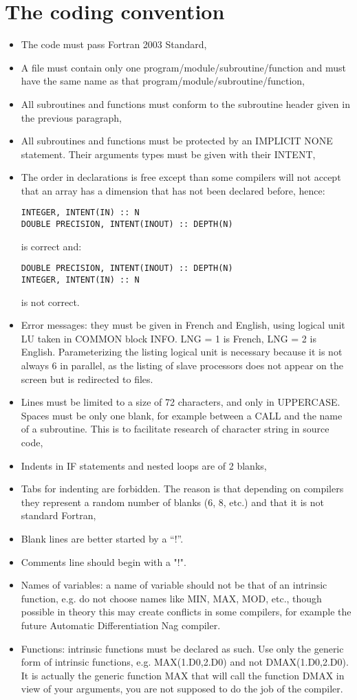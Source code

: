 \section{The coding convention}

\begin{itemize}
\item The code must pass Fortran 2003 Standard,
\item A file must contain only one program/module/subroutine/function and must
have the same name as that program/module/subroutine/function,
\item All subroutines and functions must conform to the subroutine header given
in the previous paragraph,
\item All subroutines and functions must be protected by an IMPLICIT NONE
statement. Their arguments types must be given with their INTENT,
\item The order in declarations is free except than some compilers will not
accept that an array has a dimension that has not been declared before, hence:
\begin{lstlisting}
INTEGER, INTENT(IN) :: N
DOUBLE PRECISION, INTENT(INOUT) :: DEPTH(N)
\end{lstlisting}
is correct and:
\begin{lstlisting}
DOUBLE PRECISION, INTENT(INOUT) :: DEPTH(N)
INTEGER, INTENT(IN) :: N
\end{lstlisting}
is not correct.
\item Error messages: they must be given in French and English, using logical
unit LU taken in COMMON block INFO. LNG = 1 is French, LNG = 2 is English.
Parameterizing the listing logical unit is necessary because it is not always 6
in parallel, as the listing of slave processors does not appear on the screen
but is redirected to files.
\item Lines must be limited to a size of 72 characters, and only in UPPERCASE.
Spaces must be only one blank, for example between a CALL and the name of a
subroutine. This is to facilitate research of character string in source code,
\item Indents in IF statements and nested loops are of 2 blanks,
\item Tabs for indenting are forbidden. The reason is that depending on
compilers they represent a random number of blanks (6, 8, etc.) and that it is
not standard Fortran,
\item Blank lines are better started by a “!”.
\item Comments line should begin with a "!".
\item Names of variables: a name of variable should not be that of an intrinsic
function, e.g. do not choose names like MIN, MAX, MOD, etc., though possible in
theory this may create conflicts in some compilers, for example the future
Automatic Differentiation Nag compiler.
\item Functions: intrinsic functions must be declared as such. Use only the
generic form of intrinsic functions, e.g. MAX(1.D0,2.D0) and not
DMAX(1.D0,2.D0). It is actually the generic function MAX that will call the
function DMAX in view of your arguments, you are not supposed to do the job of
the compiler.
\end{itemize}


